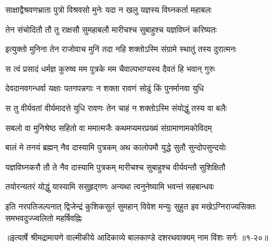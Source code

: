 \twolineshloka
{साक्षाद्वैश्रवणभ्राता पुत्रो विश्रवसो मुनेः}
{यदा न खलु यज्ञस्य विघ्नकर्ता महाबलः} %

\twolineshloka
{तेन संचोदितौ तौ तु राक्षसौ सुमहाबलौ}
{मारीचश्च सुबाहुश्च यज्ञविघ्नं करिष्यतः} %

\twolineshloka
{इत्युक्तो मुनिना तेन राजोवाच मुनिं तदा}
{नहि शक्तोऽस्मि संग्रामे स्थातुं तस्य दुरात्मनः} %

\twolineshloka
{स त्वं प्रसादं धर्मज्ञ कुरुष्व मम पुत्रके}
{मम चैवाल्पभाग्यस्य दैवतं हि भवान् गुरुः} %

\twolineshloka
{देवदानवगन्धर्वा यक्षाः पतगपन्नगाः}
{न शक्ता रावणं सोढुं किं पुनर्मानवा युधि} %

\twolineshloka
{स तु वीर्यवतां वीर्यमादत्ते युधि रावणः}
{तेन चाहं न शक्तोऽस्मि संयोद्धुं तस्य वा बलैः} %

\twolineshloka
{सबलो वा मुनिश्रेष्ठ सहितो वा ममात्मजैः}
{कथमप्यमरप्रख्यं संग्रामाणामकोविदम्} %

\twolineshloka
{बालं मे तनयं ब्रह्मन् नैव दास्यामि पुत्रकम्}
{अथ कालोपमौ युद्धे सुतौ सुन्दोपसुन्दयोः} %

\twolineshloka
{यज्ञविघ्नकरौ तौ ते नैव दास्यामि पुत्रकम्}
{मारीचश्च सुबाहुश्च वीर्यवन्तौ सुशिक्षितौ} %

\twolineshloka
{तयोरन्यतरं योद्धुं यास्यामि ससुहृद्गणः}
{अन्यथा त्वनुनेष्यामि भवन्तं सहबान्धवः} %

\twolineshloka
{इति नरपतिजल्पनात् द्विजेन्द्रं कुशिकसुतं सुमहान् विवेश मन्युः}
{सुहुत इव मखेऽग्निराज्यसिक्तः समभवदुज्ज्वलितो महर्षिवह्निः} %


॥इत्यार्षे श्रीमद्रामायणे वाल्मीकीये आदिकाव्ये बालकाण्डे दशरथवाक्यम् नाम विंशः सर्गः ॥१-२०॥

